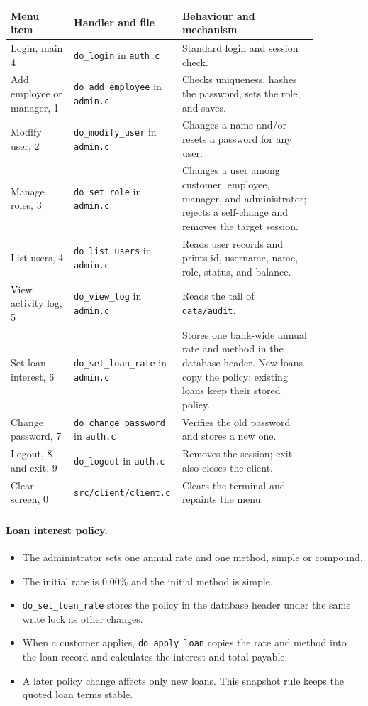 \documentclass[11pt,a4paper]{article}
\begin{document}
\begin{longtable}{L{0.20\linewidth}L{0.23\linewidth}L{0.43\linewidth}}
\hline
Menu item & Handler and file & Behaviour and mechanism \\
\hline
\endhead
Login, main 4 & \texttt{do\_login} in \texttt{auth.c} & Standard login and session check. \\
Add employee or manager, 1 & \texttt{do\_add\_employee} in \texttt{admin.c} & Checks uniqueness, hashes the password, sets the role, and saves. \\
Modify user, 2 & \texttt{do\_modify\_user} in \texttt{admin.c} & Changes a name and/or resets a password for any user. \\
Manage roles, 3 & \texttt{do\_set\_role} in \texttt{admin.c} & Changes a user among customer, employee, manager, and administrator; rejects a self-change and removes the target session. \\
List users, 4 & \texttt{do\_list\_users} in \texttt{admin.c} & Reads user records and prints id, username, name, role, status, and balance. \\
View activity log, 5 & \texttt{do\_view\_log} in \texttt{admin.c} & Reads the tail of \texttt{data/audit}. \\
Set loan interest, 6 & \texttt{do\_set\_loan\_rate} in \texttt{admin.c} & Stores one bank-wide annual rate and method in the database header. New loans copy the policy; existing loans keep their stored policy. \\
Change password, 7 & \texttt{do\_change\_password} in \texttt{auth.c} & Verifies the old password and stores a new one. \\
Logout, 8 and exit, 9 & \texttt{do\_logout} in \texttt{auth.c} & Removes the session; exit also closes the client. \\
Clear screen, 0 & \texttt{src/client/client.c} & Clears the terminal and repaints the menu. \\
\hline
\end{longtable}

\paragraph{Loan interest policy.}
\begin{itemize}
\item The administrator sets one annual rate and one method, simple or compound.
\item The initial rate is 0.00\% and the initial method is simple.
\item \texttt{do\_set\_loan\_rate} stores the policy in the database header under the same write lock as other changes.
\item When a customer applies, \texttt{do\_apply\_loan} copies the rate and method into the loan record and calculates the interest and total payable.
\item A later policy change affects only new loans. This snapshot rule keeps the quoted loan terms stable.
\end{itemize}
\end{document}
